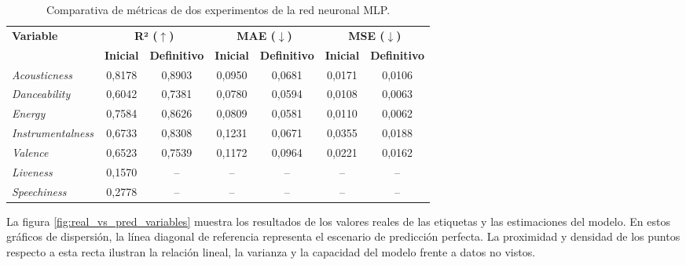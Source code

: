 \begin{table}[htpb]
    \centering
    \caption{Comparativa de métricas de dos experimentos de la red neuronal MLP.}
    \label{tab:comparativa_mlp}
    \renewcommand{\arraystretch}{1.2}
    \small
    \begin{tabular}{@{}lcccccc@{}}
        \toprule
        \multirow{2}{*}{\textbf{Variable}} & \multicolumn{2}{c}{\textbf{R² ($\uparrow$)}} & \multicolumn{2}{c}{\textbf{MAE ($\downarrow$)}} & \multicolumn{2}{c}{\textbf{MSE ($\downarrow$)}} \\
        \cmidrule(lr){2-3} \cmidrule(lr){4-5} \cmidrule(lr){6-7}
        & \textbf{Inicial} & \textbf{Definitivo} & \textbf{Inicial} & \textbf{Definitivo} & \textbf{Inicial} & \textbf{Definitivo} \\
        \midrule
        \textit{Acousticness}     & 0,8178 & 0,8903 & 0,0950 & 0,0681 & 0,0171 & 0,0106 \\
        \textit{Danceability}     & 0,6042 & 0,7381 & 0,0780 & 0,0594 & 0,0108 & 0,0063 \\
        \textit{Energy}           & 0,7584 & 0,8626 & 0,0809 & 0,0581 & 0,0110 & 0,0062 \\
        \textit{Instrumentalness} & 0,6733 & 0,8308 & 0,1231 & 0,0671 & 0,0355 & 0,0188 \\
        \textit{Valence}          & 0,6523 & 0,7539 & 0,1172 & 0,0964 & 0,0221 & 0,0162 \\
        \textit{Liveness}         & 0,1570 & -- & -- & -- & -- & -- \\
        \textit{Speechiness}      & 0,2778 & -- & -- & -- & -- & -- \\
        \bottomrule
    \end{tabular}
\end{table}

La figura \ref{fig:real_vs_pred_variables} muestra los resultados de los valores reales de las etiquetas y las estimaciones del modelo. En estos gráficos de dispersión, la línea diagonal de referencia representa el escenario de predicción perfecta. La proximidad y densidad de los puntos respecto a esta recta ilustran la relación lineal, la varianza y la capacidad del modelo frente a datos no vistos.


